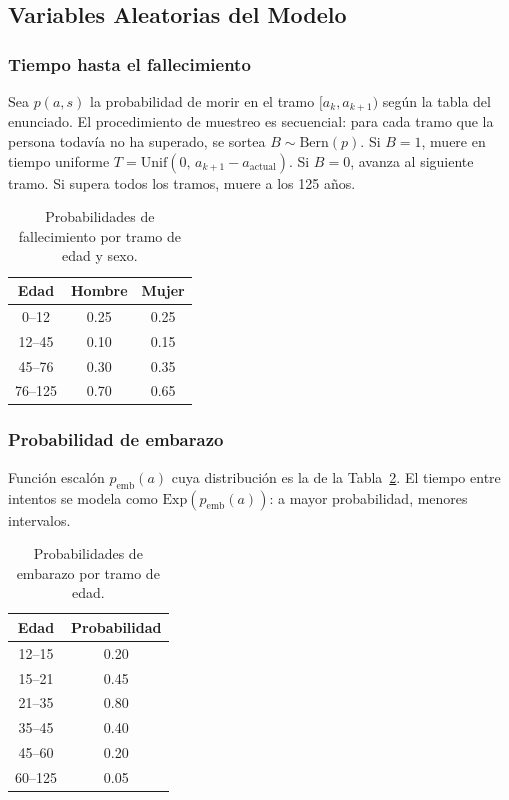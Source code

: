 \documentclass[12pt, a4paper]{article}
\newcommand{\Exp}[1]{\mathrm{Exp}\!\left(#1\right)}
\newcommand{\Unif}[2]{\mathrm{Unif}\!\left(#1,\,#2\right)}
\newcommand{\Bern}[1]{\mathrm{Bern}\!\left(#1\right)}
\begin{document}
\subsection{Variables Aleatorias del Modelo}
\label{sec:distrib}

\subsubsection*{Tiempo hasta el fallecimiento}

Sea $p(a, s)$ la probabilidad de morir en el tramo $[a_k, a_{k+1})$ según
la tabla del enunciado. El procedimiento de muestreo es secuencial:
para cada tramo que la persona todavía no ha superado, se sortea
$B \sim \Bern{p}$. Si $B=1$, muere en tiempo uniforme
$T = \Unif{0}{a_{k+1} - a_\mathrm{actual}}$. Si $B=0$, avanza al
siguiente tramo. Si supera todos los tramos, muere a los 125 años.

\begin{table}[H]
  \centering
  \caption{Probabilidades de fallecimiento por tramo de edad y sexo.}
  \label{tab:muerte}
  \begin{tabular}{@{}ccc@{}}
    \toprule
    \textbf{Edad} & \textbf{Hombre} & \textbf{Mujer} \\
    \midrule
    0--12    & 0.25 & 0.25 \\
    12--45   & 0.10 & 0.15 \\
    45--76   & 0.30 & 0.35 \\
    76--125  & 0.70 & 0.65 \\
    \bottomrule
  \end{tabular}
\end{table}

\subsubsection*{Probabilidad de embarazo}

Función escalón $p_\mathrm{emb}(a)$ cuya distribución es la de la
Tabla~\ref{tab:embarazo}. El tiempo entre intentos se modela como
$\Exp{p_\mathrm{emb}(a)}$: a mayor probabilidad, menores intervalos.

\begin{table}[H]
  \centering
  \caption{Probabilidades de embarazo por tramo de edad.}
  \label{tab:embarazo}
  \begin{tabular}{@{}cc@{}}
    \toprule
    \textbf{Edad} & \textbf{Probabilidad} \\
    \midrule
    12--15   & 0.20 \\
    15--21   & 0.45 \\
    21--35   & 0.80 \\
    35--45   & 0.40 \\
    45--60   & 0.20 \\
    60--125  & 0.05 \\
    \bottomrule
  \end{tabular}
\end{table}
\end{document}
